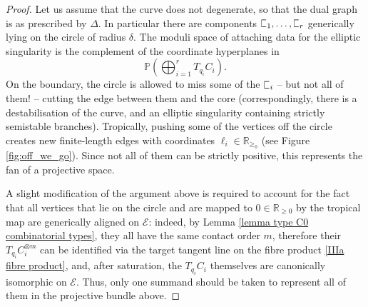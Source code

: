 \documentclass[11pt]{amsart}
\newcommand{\sqC}{\scalebox{0.8}[1.3]{$\sqsubset$}}
\newcommand{\PP}{\mathbb P}
\newcommand{\Ecal}{\mathcal{E}}
\newcommand{\RR}{\mathbb{R}}
\theoremstyle{definition}
\theoremstyle{definition}
\begin{document}
\begin{proof}
Let us assume that the curve does not degenerate, so that the dual graph is as prescribed by $\Delta$. In particular there are components $\sqC_1,\ldots,\sqC_r$ generically lying on the circle of radius $\delta$. The moduli space of attaching data for the elliptic singularity is the complement of the coordinate hyperplanes in
$$\PP\left(\bigoplus_{i=1}^rT_{q_i}C_i\right).$$
On the boundary, the circle is allowed to miss some of the $\sqC_i$ -- but not all of them! --  cutting the edge between them and the core (correspondingly, there is a destabilisation of the curve, and an elliptic singularity containing strictly semistable branches). Tropically, pushing some of the vertices off the circle creates new finite-length edges with coordinates $\ell_i\in\RR_{\geq_0}$ (see Figure \ref{fig:off_we_go}). Since not all of them can be strictly positive, this represents the fan of a projective space.

A slight modification of the argument above is required to account for the fact that all vertices that lie on the circle and are mapped to $0\in\mathbb R_{\geq0}$ by the tropical map are generically aligned on $\Ecal$: indeed, by Lemma \ref{lemma type C0 combinatorial types}, they all have the same contact order $m$, therefore their $T_{q_i}C_i^{\otimes m}$ can be identified via the target tangent line on the fibre product \eqref{IIIa fibre product}, and, after saturation, the $T_{q_i}C_i$ themselves are canonically isomorphic on $\Ecal$. Thus, only one summand should be taken to represent all of them in the projective bundle above.
\end{proof}
\end{document}
